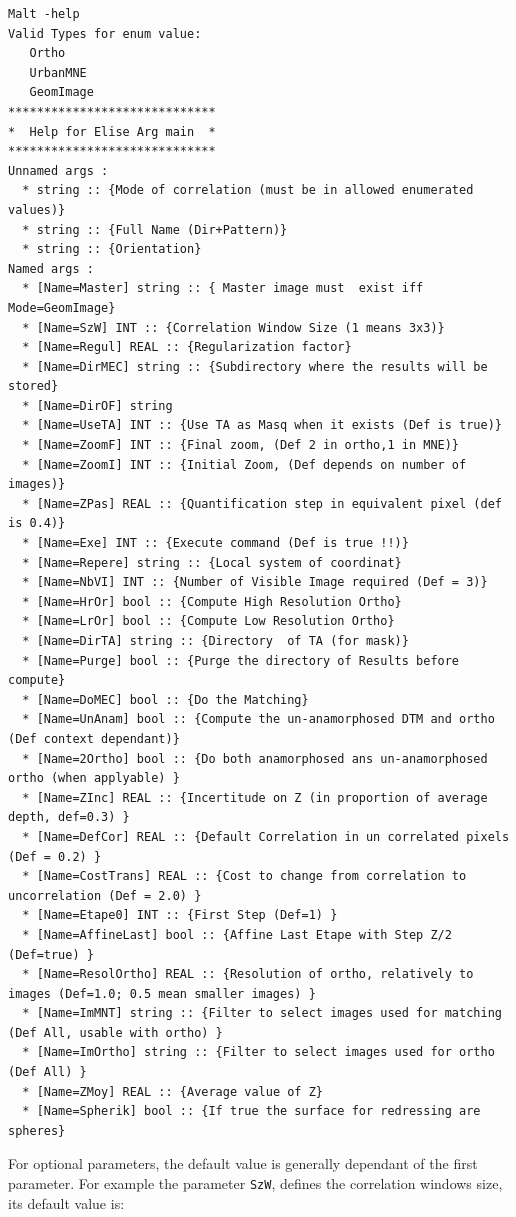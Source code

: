 {\scriptsize
\begin{verbatim}
Malt -help
Valid Types for enum value:
   Ortho
   UrbanMNE
   GeomImage
*****************************
*  Help for Elise Arg main  *
*****************************
Unnamed args :
  * string :: {Mode of correlation (must be in allowed enumerated values)}
  * string :: {Full Name (Dir+Pattern)}
  * string :: {Orientation}
Named args :
  * [Name=Master] string :: { Master image must  exist iff Mode=GeomImage}
  * [Name=SzW] INT :: {Correlation Window Size (1 means 3x3)}
  * [Name=Regul] REAL :: {Regularization factor}
  * [Name=DirMEC] string :: {Subdirectory where the results will be stored}
  * [Name=DirOF] string
  * [Name=UseTA] INT :: {Use TA as Masq when it exists (Def is true)}
  * [Name=ZoomF] INT :: {Final zoom, (Def 2 in ortho,1 in MNE)}
  * [Name=ZoomI] INT :: {Initial Zoom, (Def depends on number of images)}
  * [Name=ZPas] REAL :: {Quantification step in equivalent pixel (def is 0.4)}
  * [Name=Exe] INT :: {Execute command (Def is true !!)}
  * [Name=Repere] string :: {Local system of coordinat}
  * [Name=NbVI] INT :: {Number of Visible Image required (Def = 3)}
  * [Name=HrOr] bool :: {Compute High Resolution Ortho}
  * [Name=LrOr] bool :: {Compute Low Resolution Ortho}
  * [Name=DirTA] string :: {Directory  of TA (for mask)}
  * [Name=Purge] bool :: {Purge the directory of Results before compute}
  * [Name=DoMEC] bool :: {Do the Matching}
  * [Name=UnAnam] bool :: {Compute the un-anamorphosed DTM and ortho (Def context dependant)}
  * [Name=2Ortho] bool :: {Do both anamorphosed ans un-anamorphosed ortho (when applyable) }
  * [Name=ZInc] REAL :: {Incertitude on Z (in proportion of average depth, def=0.3) }
  * [Name=DefCor] REAL :: {Default Correlation in un correlated pixels (Def = 0.2) }
  * [Name=CostTrans] REAL :: {Cost to change from correlation to uncorrelation (Def = 2.0) }
  * [Name=Etape0] INT :: {First Step (Def=1) }
  * [Name=AffineLast] bool :: {Affine Last Etape with Step Z/2 (Def=true) }
  * [Name=ResolOrtho] REAL :: {Resolution of ortho, relatively to images (Def=1.0; 0.5 mean smaller images) }
  * [Name=ImMNT] string :: {Filter to select images used for matching (Def All, usable with ortho) }
  * [Name=ImOrtho] string :: {Filter to select images used for ortho (Def All) }
  * [Name=ZMoy] REAL :: {Average value of Z}
  * [Name=Spherik] bool :: {If true the surface for redressing are spheres}
\end{verbatim}
}

For  optional parameters, the default value is generally dependant of the first
parameter. For example the parameter {\tt SzW}, defines the correlation
windows size, its default value is:


